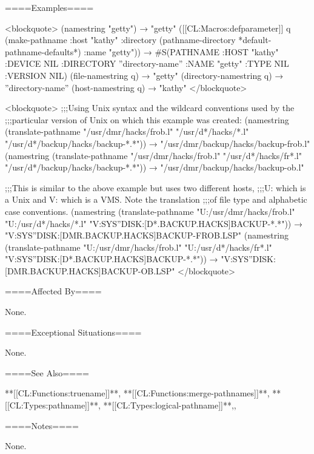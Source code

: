 ====Examples====

<blockquote> (namestring "getty") → "getty" ([[CL:Macros:defparameter]] q (make-pathname :host "kathy" :directory (pathname-directory *default-pathname-defaults*) :name "getty")) → #S(PATHNAME :HOST "kathy" :DEVICE NIL :DIRECTORY ''directory-name'' :NAME "getty" :TYPE NIL :VERSION NIL) (file-namestring q) → "getty" (directory-namestring q) → ''directory-name'' (host-namestring q) → "kathy" </blockquote>

<blockquote> ;;;Using Unix syntax and the wildcard conventions used by the ;;;particular version of Unix on which this example was created: (namestring (translate-pathname "/usr/dmr/hacks/frob.l" "/usr/d*/hacks/*.l" "/usr/d*/backup/hacks/backup-*.*")) → "/usr/dmr/backup/hacks/backup-frob.l" (namestring (translate-pathname "/usr/dmr/hacks/frob.l" "/usr/d*/hacks/fr*.l" "/usr/d*/backup/hacks/backup-*.*")) → "/usr/dmr/backup/hacks/backup-ob.l"

;;;This is similar to the above example but uses two different hosts, ;;;U: which is a Unix and V: which is a VMS. Note the translation ;;;of file type and alphabetic case conventions. (namestring (translate-pathname "U:/usr/dmr/hacks/frob.l" "U:/usr/d*/hacks/*.l" "V:SYS''DISK:[D*.BACKUP.HACKS]BACKUP-*.*")) → "V:SYS''DISK:[DMR.BACKUP.HACKS]BACKUP-FROB.LSP" (namestring (translate-pathname "U:/usr/dmr/hacks/frob.l" "U:/usr/d*/hacks/fr*.l" "V:SYS''DISK:[D*.BACKUP.HACKS]BACKUP-*.*")) → "V:SYS''DISK:[DMR.BACKUP.HACKS]BACKUP-OB.LSP" </blockquote>


====Affected By====

None.

====Exceptional Situations====

None.

====See Also====

**[[CL:Functions:truename]]**, **[[CL:Functions:merge-pathnames]]**, **[[CL:Types:pathname]]**, **[[CL:Types:logical-pathname]]**,{\secref\FileSystemConcepts},

{\secref\PathnamesAsFilenames}

====Notes====

None.


     
